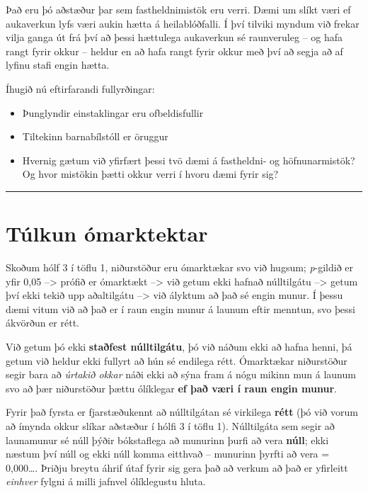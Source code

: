 \documentclass[
]{book}
\begin{document}
Það eru þó aðstæður þar sem fastheldnimistök eru verri. Dæmi um slíkt væri ef aukaverkun lyfs væri aukin hætta á heilablóðfalli. Í því tilviki myndum við frekar vilja ganga út frá því að þessi hættulega aukaverkun sé raunveruleg -- og hafa rangt fyrir okkur -- heldur en að hafa rangt fyrir okkur með því að segja að af lyfinu stafi engin hætta.

Íhugið nú eftirfarandi fullyrðingar:

\begin{itemize}
\item
  Þunglyndir einstaklingar eru ofbeldisfullir
\item
  Tiltekinn barnabílstóll er öruggur
\item
  Hvernig gætum við yfirfært þessi tvö dæmi á fastheldni- og höfnunarmistök? Og hvor mistökin þætti okkur verri í hvoru dæmi fyrir sig?
\end{itemize}

\begin{center}\rule{0.5\linewidth}{0.5pt}\end{center}

\hypertarget{tuxfalkun-uxf3marktektar}{%
\section{Túlkun ómarktektar}\label{tuxfalkun-uxf3marktektar}}

Skoðum hólf 3 í töflu 1, niðurstöður eru ómarktækar svo við hugsum; \emph{p}-gildið er yfir 0,05 --\textgreater{} prófið er ómarktækt --\textgreater{} við getum ekki hafnað núlltilgátu --\textgreater{} getum því ekki tekið upp aðaltilgátu --\textgreater{} við ályktum að það sé engin munur. Í þessu dæmi vitum við að það er í raun engin munur á launum eftir menntun, svo þessi ákvörðun er rétt.

Við getum þó ekki \textbf{staðfest núlltilgátu}, þó við náðum ekki að hafna henni, þá getum við heldur ekki fullyrt að hún sé endilega rétt. Ómarktækar niðurstöður segir bara að \emph{úrtakið okkar} náði ekki að sýna fram á nógu mikinn mun á launum svo að þær niðurstöður þættu ólíklegar \textbf{ef það væri í raun engin munur}.

Fyrir það fyrsta er fjarstæðukennt að núlltilgátan sé virkilega \textbf{rétt} (þó við vorum að ímynda okkur slíkar aðstæður í hólfi 3 í töflu 1). Núlltilgáta sem segir að launamunur sé núll þýðir bókstaflega að munurinn þurfi að vera \textbf{núll}; ekki næstum því núll og ekki núll komma eitthvað -- munurinn þyrfti að vera = 0,000\ldots. Þriðju breytu áhrif útaf fyrir sig gera það að verkum að það er yfirleitt \emph{einhver} fylgni á milli jafnvel ólíklegustu hluta.
\end{document}
